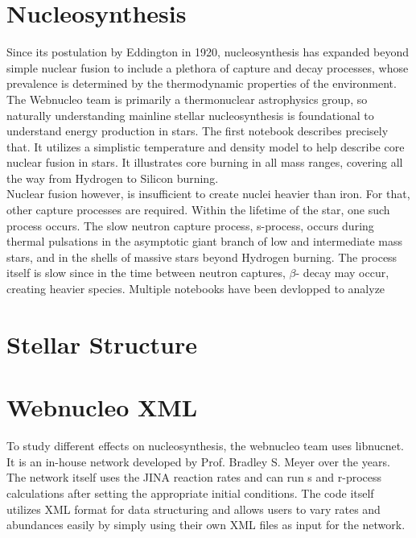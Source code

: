\documentclass{article}
\begin{document}
\section*{Nucleosynthesis}

Since its postulation by Eddington in 1920, nucleosynthesis has expanded beyond simple nuclear fusion to include a plethora of 
capture and decay processes, whose prevalence is determined by the thermodynamic properties of the environment. The Webnucleo team 
is primarily a thermonuclear astrophysics group, so naturally understanding mainline stellar nucleosynthesis is foundational to 
understand energy production in stars. The first notebook describes precisely that. It utilizes a simplistic temperature and density 
model to help describe core nuclear fusion in stars. It illustrates core burning in all mass ranges, covering all the way from 
Hydrogen to Silicon burning.\\

Nuclear fusion however, is insufficient to create nuclei heavier than iron. For that, other capture processes are required. Within 
the lifetime of the star, one such process occurs. The slow neutron capture process, s-process, occurs during thermal pulsations in 
the asymptotic giant branch of low and intermediate mass stars, and in the shells of massive stars beyond Hydrogen burning. 
The process itself is slow since in the time between neutron captures, $\beta$- decay may occur, creating heavier species. Multiple 
notebooks have been devlopped to analyze 


\section*{Stellar Structure}

\section*{Webnucleo XML}

To study different effects on nucleosynthesis, the webnucleo team uses libnucnet. It is an in-house network developed by Prof. Bradley 
S. Meyer over the years. The network itself uses the JINA reaction rates and can run s and r-process calculations after setting the 
appropriate initial conditions. The code itself utilizes XML format for data structuring and allows users to vary rates and abundances 
easily by simply using their own XML files as input for the network.\\
\end{document}
